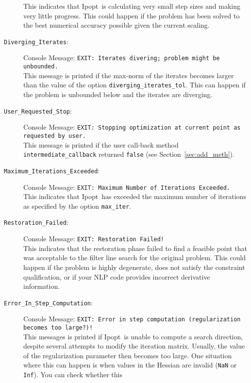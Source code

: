 \documentclass[10pt]{article}
\newcommand{\Ipopt}{{\sc Ipopt}}
\begin{document}
\begin{description}
  This indicates that \Ipopt\ is calculating very small step sizes and
  making very little progress.  This could happen if the problem has
  been solved to the best numerical accuracy possible given the
  current scaling.
\item[{\tt Diverging\_Iterates}:]  $\;$ \\
  Console Message: {\tt EXIT: Iterates divering; problem might be
    unbounded.} \\
  This message is printed if the max-norm of the iterates becomes
  larger than the value of the option {\tt diverging\_iterates\_tol}.
  This can happen if the problem is unbounded below and the iterates
  are diverging.
\item[{\tt User\_Requested\_Stop}:]  $\;$ \\
  Console Message: {\tt EXIT: Stopping optimization at current point
    as requested by user.} \\
  This message is printed if the user call-back method {\tt
    intermediate\_callback} returned {\tt false} (see
  Section~\ref{sec:add_meth}).
\item[{\tt Maximum\_Iterations\_Exceeded}:]  $\;$ \\
  Console Message: {\tt EXIT: Maximum Number of Iterations Exceeded.} \\
  This indicates that \Ipopt\ has exceeded the maximum number of
  iterations as specified by the option {\tt max\_iter}.
\item[{\tt Restoration\_Failed}:]  $\;$ \\
  Console Message: {\tt EXIT: Restoration Failed!} \\
  This indicates that the restoration phase failed to find a feasible
  point that was acceptable to the filter line search for the original
  problem. This could happen if the problem is highly degenerate, does
  not satisfy the constraint qualification, or if your NLP code
  provides incorrect derivative information.
\item[{\tt Error\_In\_Step\_Computation}:]  $\;$ \\
  Console Message: {\tt EXIT: Error in step computation (regularization becomes too large?)!} \\
  This messages is printed if \Ipopt\ is unable to compute a search
  direction, despite several attempts to modify the iteration matrix.
  Usually, the value of the regularization parameter then becomes too
  large.  One situation where this can happen is when values in the
  Hessian are invalid ({\tt NaN} or {\tt Inf}).  You can check whether this

\end{description}
\end{document}
